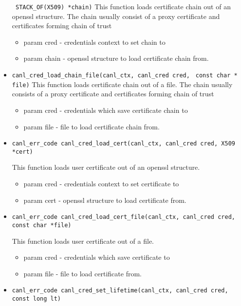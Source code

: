\begin{itemize}
  \verb' STACK_OF(X509) *chain)'
  This function loads certificate chain out of an openssl structure. The 
  chain usually 
  consist of a proxy certificate and certificates forming
  chain of trust
  \begin{itemize}
    \item param cred - credentials context to set chain to
    \item param chain - openssl structure to load certificate chain from.
  \end{itemize}
  \item \verb'canl_cred_load_chain_file(canl_ctx, canl_cred cred,'
  \verb' const char * file)'
  This function loads certificate chain out of a file. The chain usually 
  consists of a proxy certificate and certificates forming
  chain of trust
  \begin{itemize}
    \item param cred - credentials which save certificate chain to
    \item param file - file to load certificate chain from.
  \end{itemize}
  \item \begin{verbatim}
canl_err_code canl_cred_load_cert(canl_ctx, canl_cred cred, X509 *cert)\end{verbatim}
  This function loads user certificate out of an openssl structure.
  \begin{itemize}
    \item param cred - credentials context to set certificate to 
    \item param cert - openssl structure to load certificate from.
    \end{itemize}
  \item \begin{verbatim}
canl_err_code canl_cred_load_cert_file(canl_ctx, canl_cred cred, 
const char *file)\end{verbatim}
  This function loads user certificate out of a file.
  \begin{itemize}
    \item param cred - credentials which save certificate to
    \item param file - file to load certificate from.
  \end{itemize}
  \item \begin{verbatim}
canl_err_code canl_cred_set_lifetime(canl_ctx, canl_cred cred, const long lt)\end{verbatim}

\end{itemize}
